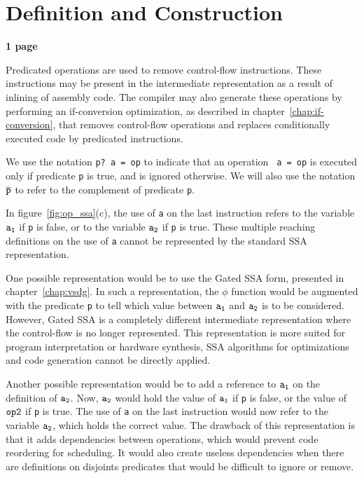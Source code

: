 \section{Definition and Construction}

\textbf{1 page}


Predicated operations are used to remove control-flow instructions.
These instructions may be present in the intermediate representation
as a result of inlining of assembly code. The compiler may also
generate these operations by performing an if-conversion optimization,
as described in chapter~\ref{chap:if-conversion}, that removes
control-flow operations and replaces conditionally executed code by
predicated instructions.

We use the notation {\tt p? a = op} to indicate that an operation {\tt
  a = op} is executed only if predicate {\tt p} is true, and is
ignored otherwise. We will also use the notation ${\tt \overline{p}}$
to refer to the complement of predicate {\tt p}.

In figure~\ref{fig:op_ssa}(c), the use of {\tt a} on the last
instruction refers to the variable ${\tt a_1}$ if {\tt p} is false, or
to the variable ${\tt a_2}$ if {\tt p} is true. These multiple
reaching definitions on the use of {\tt a} cannot be represented by
the standard SSA representation.

One possible representation would be to use the Gated SSA form,
presented in chapter~\ref{chap:vsdg}. In such a representation, the
$\phi$ function would be augmented with the predicate {\tt p} to tell
which value between ${\tt a_1}$ and ${\tt a_2}$ is to be
considered. However, Gated SSA is a completely different intermediate
representation where the control-flow is no longer represented. This
representation is more suited for program interpretation or hardware
synthesis, SSA algorithms for optimizations and code generation cannot
be directly applied.

Another possible representation would be to add a reference to ${\tt
  a_1}$ on the definition of ${\tt a_2}$. Now, ${\tt a_2}$ would hold
the value of ${\tt a_1}$ if {\tt p} is false, or the value of ${\tt
  op2}$ if {\tt p} is true. The use of {\tt a} on the last instruction
would now refer to the variable ${\tt a_2}$, which holds the correct
value. The drawback of this representation is that it adds
dependencies between operations, which would prevent code reordering
for scheduling. It would also create useless dependencies when there
are definitions on disjoints predicates that would be difficult to
ignore or remove.

